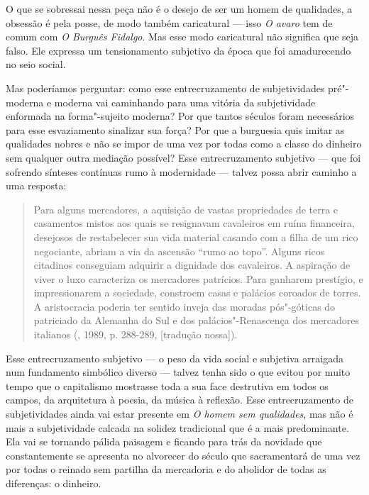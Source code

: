 O que se sobressai nessa peça não é o desejo de ser um homem de
qualidades, a obsessão é pela posse, de modo também caricatural --- isso
\emph{O avaro} tem de comum com \emph{O Burguês Fidalgo}. Mas esse modo
caricatural não significa que seja falso. Ele expressa um tensionamento
subjetivo da época que foi amadurecendo no seio social.

Mas poderíamos perguntar: como esse entrecruzamento de subjetividades
pré"-moderna e moderna vai caminhando para uma vitória da subjetividade
enformada na forma"-sujeito moderna? Por que tantos séculos foram
necessários para esse esvaziamento sinalizar sua força? Por que a
burguesia quis imitar as qualidades nobres e não se impor de uma vez por
todas como a classe do dinheiro sem qualquer outra mediação possível?
Esse entrecruzamento subjetivo --- que foi sofrendo sínteses contínuas
rumo à modernidade --- talvez possa abrir caminho a uma resposta:

\begin{quote}
Para alguns mercadores, a aquisição de vastas propriedades de terra e
casamentos mistos aos quais se resignavam cavaleiros em ruína
financeira, desejosos de restabelecer sua vida material casando com a
filha de um rico negociante, abriam a via da ascensão ``rumo ao topo''.
Alguns ricos citadinos conseguiam adquirir a dignidade dos cavaleiros. A
aspiração de viver o luxo caracteriza os mercadores patrícios. Para
ganharem prestígio, e impressionarem a sociedade, constroem casas e
palácios coroados de torres. A aristocracia poderia ter sentido inveja
das moradas pós"-góticas do patriciado da Alemanha do Sul e dos
palácios"-Renascença dos mercadores italianos (, 1989, p. 288-289, [tradução nossa]).
\end{quote}

Esse entrecruzamento subjetivo --- o peso da vida social e subjetiva arraigada
num fundamento simbólico diverso --- talvez tenha sido o que evitou por muito
tempo que o capitalismo mostrasse toda a sua face destrutiva em todos os
campos, da arquitetura à poesia, da música à reflexão. Esse
entrecruzamento de subjetividades ainda vai estar presente em \emph{O
homem sem qualidades}, mas não é mais a subjetividade calcada na solidez
tradicional que é a mais predominante. Ela vai se tornando pálida
paisagem e ficando para trás da novidade que constantemente se apresenta
no alvorecer do século  que sacramentará de uma vez por todas o
reinado sem partilha da mercadoria e do abolidor de todas as diferenças:
o dinheiro.

